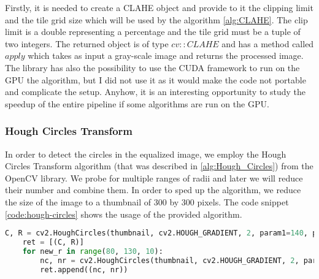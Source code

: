 Firstly, it is needed to create a CLAHE object and provide to it the clipping limit and the tile grid size which will be used by the algorithm \ref{alg:CLAHE}. The clip limit is a double representing a percentage and the tile grid must be a tuple of two integers. The returned object is of type $cv::CLAHE$ and has a method called $apply$ which takes as input a gray-scale image and returns the processed image. The library has also the possibility to use the CUDA framework to run on the GPU the algorithm, but I did not use it as it would make the code not portable and complicate the setup. Anyhow, it is an interesting opportunity to study the speedup of the entire pipeline if some algorithms are run on the GPU.

\subsubsection{Hough Circles Transform}

In order to detect the circles in the equalized image, we employ the Hough Circles Transform \cite{site:circular_hough_transform} algorithm (that was described in \ref{alg:Hough_Circles}) from the OpenCV library. We probe for multiple ranges of radii and later we will reduce their number and combine them. In order to sped up the algorithm, we reduce the size of the image to a thumbnail of 300 by 300 pixels. The code snippet \ref{code:hough-circles} shows the usage of the provided algorithm.

\begin{lstlisting}[language=Python, label=code:hough-circles, caption={Hough Circles Transform}]
    C, R = cv2.HoughCircles(thumbnail, cv2.HOUGH_GRADIENT, 2, param1=140, param2=130, minDist=thumbnail.shape[0], minRadius=70, maxRadius=140)[0]
    ret = [(C, R)]
    for new_r in range(80, 130, 10):
        nc, nr = cv2.HoughCircles(thumbnail, cv2.HOUGH_GRADIENT, 2, param1=140, param2=130, minDist=thumbnail.shape[0], minRadius=new_r - 5, maxRadius=new_r + 5)[0]
        ret.append((nc, nr))
\end{lstlisting}

